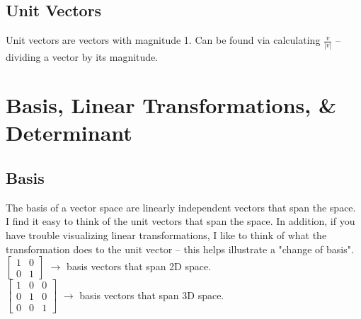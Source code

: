 \documentclass{article}
\begin{document}
\subsection{Unit Vectors}
Unit vectors are vectors with magnitude 1. Can be found via calculating $\frac{v}{|v|}$ -- dividing a vector by its magnitude.

\section{Basis, Linear Transformations, \& Determinant}

\subsection{Basis}
The basis of a vector space are linearly independent vectors that span the space. I find it easy to think of the unit vectors that span the space. In addition, if you have trouble visualizing linear transformations, I like to think of what the transformation does to the unit vector -- this helps illustrate a "change of basis". 
\\
$\begin{bmatrix}
    1 & 0 \\
    0 & 1
\end{bmatrix}$ $\rightarrow$ basis vectors that span 2D space.\\ 
$\begin{bmatrix}
    1 & 0 & 0\\
    0 & 1 & 0 \\
    0 & 0 & 1
\end{bmatrix}$ $\rightarrow$ basis vectors that span 3D space.
\end{document}
